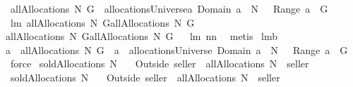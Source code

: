\begin{isabellebody}
\isamarkupfalse%
\ {\isachardoublequoteopen}allAllocations{\isacharprime}{\isacharprime}\ N\ G\ {\isacharequal}{\isacharequal}\ allocationsUniverse{\isasyminter}{\isacharbraceleft}a{\isachardot}\ Domain\ a\ {\isasymsubseteq}\ N\ {\isacharampersand}\ {\isasymUnion}\ Range\ a\ {\isacharequal}\ G{\isacharbraceright}{\isachardoublequoteclose}\isanewline
{}\isamarkupfalse%
\ lm{}{}{\isacharcolon}\ {\isachardoublequoteopen}allAllocations\ N\ G{\isacharequal}allAllocations{\isacharprime}\ N\ G\ {\isacharampersand}\ \isanewline
allAllocations\ N\ G{\isacharequal}allAllocations{\isacharprime}{\isacharprime}\ N\ G{\isachardoublequoteclose}%
\isadelimproof
\ %
\endisadelimproof
%
\isatagproof
{}\isamarkupfalse%
\ lm{}{}\ nn{}{}\ \isamarkupfalse%
\ metis%
\endisatagproof
{\isafoldproof}%
%
\isadelimproof
%
\endisadelimproof
\isanewline
{}\isamarkupfalse%
\ lm{}{}b{\isacharcolon}\ \isanewline
{\isachardoublequoteopen}{\isacharparenleft}a\ {\isasymin}\ allAllocations{\isacharprime}{\isacharprime}\ N\ G{\isacharparenright}\ {\isacharequal}\ {\isacharparenleft}a\ {\isasymin}\ allocationsUniverse{\isacharampersand}\ Domain\ a\ {\isasymsubseteq}\ N\ {\isacharampersand}\ {\isasymUnion}\ Range\ a\ {\isacharequal}\ G{\isacharparenright}{\isachardoublequoteclose}%
\isadelimproof
\ %
\endisadelimproof
%
\isatagproof
{}\isamarkupfalse%
\ force%
\endisatagproof
{\isafoldproof}%
%
\isadelimproof
%
\endisadelimproof
\isanewline
{}\isamarkupfalse%
\ {\isachardoublequoteopen}soldAllocations\ N\ {\isasymOmega}\ {\isacharequal}{\isacharequal}\ \isanewline
{\isacharparenleft}Outside{\isacharprime}\ {\isacharbraceleft}seller{\isacharbraceright}{\isacharparenright}\ {\isacharbackquote}\ {\isacharparenleft}allAllocations\ {\isacharparenleft}N\ {\isasymunion}\ {\isacharbraceleft}seller{\isacharbraceright}{\isacharparenright}\ {\isasymOmega}{\isacharparenright}{\isachardoublequoteclose}\isanewline
{}\isamarkupfalse%
\ {\isachardoublequoteopen}soldAllocations{\isacharprime}\ N\ {\isasymOmega}\ {\isacharequal}{\isacharequal}\ \isanewline
{\isacharparenleft}Outside{\isacharprime}\ {\isacharbraceleft}seller{\isacharbraceright}{\isacharparenright}\ {\isacharbackquote}\ {\isacharparenleft}allAllocations{\isacharprime}\ {\isacharparenleft}N\ {\isasymunion}\ {\isacharbraceleft}seller{\isacharbraceright}{\isacharparenright}\ {\isasymOmega}{\isacharparenright}{\isachardoublequoteclose}\isanewline

\end{isabellebody}
